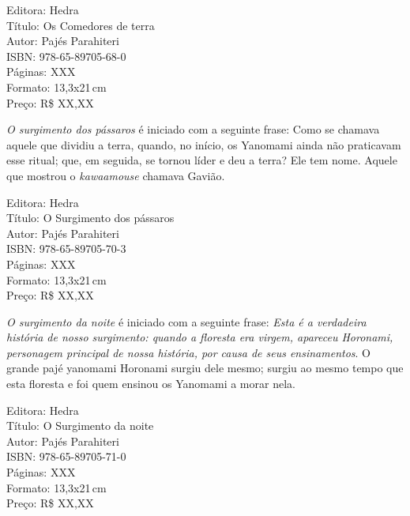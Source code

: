 \begin{ficha}
Editora: Hedra\\
Título: Os Comedores de terra\\
Autor:  Pajés Parahiteri\\ 
ISBN: 978-65-89705-68-0\\
Páginas: XXX\\
Formato: 13,3x21\,cm\\
Preço: R\$ XX,XX\\
\end{ficha}

\pagebreak


\noindent{}\textit{O surgimento dos pássaros} é iniciado com a seguinte frase: Como se chamava aquele que dividiu a terra, quando, no início, os Yanomami ainda não praticavam esse ritual; que, em seguida, se tornou líder e deu a terra? Ele tem nome. Aquele que mostrou o \textit{kawaamouse} chamava Gavião.

\begin{ficha}
Editora: Hedra\\
Título: O Surgimento dos pássaros\\
Autor:  Pajés Parahiteri\\ 
ISBN: 978-65-89705-70-3\\
Páginas: XXX\\
Formato: 13,3x21\,cm\\
Preço: R\$ XX,XX\\
\end{ficha}

\pagebreak


\noindent{}\textit{O surgimento da noite} é iniciado com a seguinte frase: \textit{Esta é a verdadeira história de nosso surgimento: quando a floresta era virgem, apareceu Horonami, personagem principal de nossa história, por causa de seus ensinamentos}. O grande pajé yanomami Horonami surgiu dele mesmo; surgiu ao mesmo tempo que esta floresta e foi quem ensinou os Yanomami a morar nela.

\begin{ficha}
Editora: Hedra\\
Título: O Surgimento da noite\\
Autor:  Pajés Parahiteri\\ 
ISBN: 978-65-89705-71-0\\
Páginas: XXX\\
Formato: 13,3x21\,cm\\
Preço: R\$ XX,XX\\
\end{ficha}

